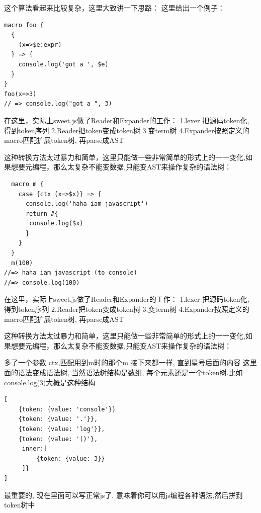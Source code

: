 \documentclass{article}
\begin{document}
\begin{CJK}{UTF8}{gbsn}
	这个算法看起来比较复杂，这里大致讲一下思路：
	这里给出一个例子：	
\end{CJK}

\begin{lstlisting}
macro foo {
  {
    (x=>$e:expr)
  } => {
    console.log('got a ', $e)
  }
}
foo(x=>3) 
// => console.log("got a ", 3)
\end{lstlisting}


\begin{CJK}{UTF8}{gbsn}
在这里，实际上sweet.js做了Reader和Expander的工作：
1.lexer 把源码token化, 得到token序列
2.Reader把token变成token树
3.变term树
4.Expander按照定义的macro匹配扩展token树, 再parse成AST

这种转换方法太过暴力和简单，这里只能做一些非常简单的形式上的一一变化,如果想要元编程，那么太复杂不能变数据,只能变AST来操作复杂的语法树：
\end{CJK}

\begin{lstlisting}
  macro m {
    case {ctx (x=>$x)} => {
      console.log('haha iam javascript')
      return #{
       console.log($x) 
      }
    }
  }
  m(100) 
//=> haha iam javascript (to console)
//=> console.log(100)
\end{lstlisting}

\begin{CJK}{UTF8}{gbsn}
在这里，实际上sweet.js做了Reader和Expander的工作：
1.lexer 把源码token化, 得到token序列
2.Reader把token变成token树
3.变term树
4.Expander按照定义的macro匹配扩展token树, 再parse成AST

这种转换方法太过暴力和简单，这里只能做一些非常简单的形式上的一一变化,如果想要元编程，那么太复杂不能变数据,只能变AST来操作复杂的语法树：
\end{CJK}

\begin{CJK}{UTF8}{gbsn}
多了一个参数 ctx,匹配用到m时的那个m
接下来都一样, 直到星号后面的内容
这里面的语法变成语法树, 当然语法树结构是数组, 每个元素还是一个token树.比如console.log(3)大概是这种结构
\end{CJK}
\begin{lstlisting}
[
    {token: {value: 'console'}}
    {token: {value: '.'}},
    {token: {value: 'log'}},
    {token: {value: '()'},
     inner:[
         {token: {value: 3}}
     ]}
]
\end{lstlisting}

\begin{CJK}{UTF8}{gbsn}
最重要的, 现在里面可以写正常js了, 意味着你可以用js编程各种语法,然后拼到token树中
\end{CJK}
\end{document}
